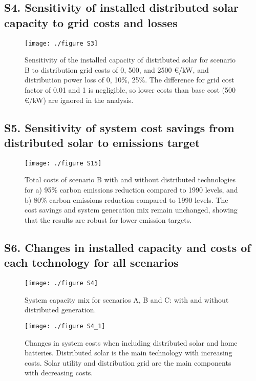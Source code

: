 	\subsection*{S4. Sensitivity of installed distributed solar capacity to grid costs and losses}
	
	\begin{figure}[H]
		\renewcommand*{\thefigure}{S\arabic{figure}}
		\texttt{[image: ./figure S3]}
		\caption{Sensitivity of the installed capacity of distributed solar for scenario B to distribution grid costs of 0, 500, and 2500 €/kW, and distribution power loss of 0, 10\%, 25\%. The difference for grid cost factor of 0.01 and 1 is negligible, so lower costs than base cost (500 €/kW) are ignored in the analysis.}
		
	\end{figure}
	
	\subsection*{S5. Sensitivity of system cost savings from distributed solar to emissions target}
	
	\begin{figure}[H]
		\renewcommand*{\thefigure}{S\arabic{figure}}
		\texttt{[image: ./figure S15]}
		\caption{Total costs of scenario B with and without distributed technologies for a) 95\% carbon emissions reduction compared to 1990 levels, and b) 80\% carbon emissions reduction compared to 1990 levels. The cost savings and system generation mix remain unchanged, showing that the results are robust for lower emission targets.}
	\end{figure}
	
	\subsection*{S6. Changes in installed capacity and costs of each technology for all scenarios}
	
	\begin{figure}[H]
		\renewcommand*{\thefigure}{S\arabic{figure}}
		\texttt{[image: ./figure S4]}
		\caption{System capacity mix for scenarios A, B and C: with and without distributed generation.}
	\end{figure}
	
	\begin{figure}[H]
		\renewcommand*{\thefigure}{S\arabic{figure}}
		\texttt{[image: ./figure S4\_1]}
		\caption{Changes in system costs when including distributed solar and home batteries. Distributed solar is the main technology with increasing costs. Solar utility and distribution grid are the main components with decreasing costs.}
	\end{figure}
	
